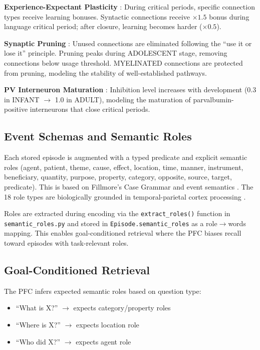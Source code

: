 \documentclass[11pt]{article}
\begin{document}
\textbf{Experience-Expectant Plasticity} \citep{greenough1987experience}: During critical periods,
specific connection types receive learning bonuses. Syntactic connections receive $\times 1.5$ bonus
during language critical period; after closure, learning becomes harder ($\times 0.5$).

\textbf{Synaptic Pruning} \citep{huttenlocher1979synaptic}: Unused connections are eliminated
following the ``use it or lose it'' principle. Pruning peaks during ADOLESCENT stage,
removing connections below usage threshold. MYELINATED connections are protected from pruning,
modeling the stability of well-established pathways.

\textbf{PV Interneuron Maturation} \citep{hensch2005critical}: Inhibition level increases with
development (0.3 in INFANT $\rightarrow$ 1.0 in ADULT), modeling the maturation of parvalbumin-positive
interneurons that close critical periods.

\subsection{Event Schemas and Semantic Roles}

Each stored episode is augmented with a typed predicate and explicit semantic roles 
(agent, patient, theme, cause, effect, location, time, manner, instrument, beneficiary, 
quantity, purpose, property, category, opposite, source, target, predicate).
This is based on Fillmore's Case Grammar \citep{fillmore1968case} and event semantics 
\citep{zacks2001event}. The 18 role types are biologically grounded in temporal-parietal 
cortex processing \citep{binder2009semantic}.

Roles are extracted during encoding via the \texttt{extract\_roles()} function in 
\texttt{semantic\_roles.py} and stored in \texttt{Episode.semantic\_roles} as a 
role$\rightarrow$words mapping. This enables goal-conditioned retrieval where the PFC 
biases recall toward episodes with task-relevant roles.

\subsection{Goal-Conditioned Retrieval}

The PFC infers expected semantic roles based on question type:
\begin{itemize}
\item ``What is X?'' $\rightarrow$ expects category/property roles
\item ``Where is X?'' $\rightarrow$ expects location role
\item ``Who did X?'' $\rightarrow$ expects agent role
\end{itemize}
\end{document}
